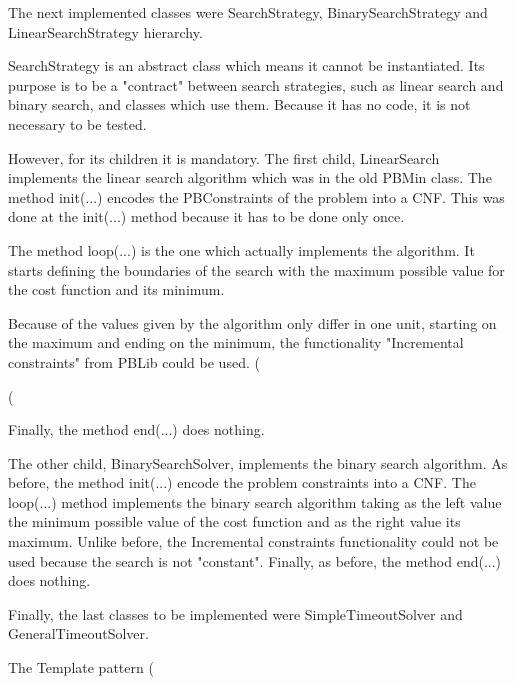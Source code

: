 The next implemented classes were SearchStrategy, BinarySearchStrategy and LinearSearchStrategy hierarchy.  

SearchStrategy is an abstract class which means it cannot be instantiated. Its purpose is to be a "contract" between search strategies, such as linear search and binary search, and classes which use them. Because it has no code, it is not necessary to be tested.  



However, for its children it is mandatory. The first child, LinearSearch implements the linear search algorithm which was in the old PBMin class. The method init(...) encodes the PBConstraints of the problem into a CNF. This was done at the init(...) method because it has to be done only once.  

The method loop(...) is the one which actually implements the algorithm. It starts defining the boundaries of the search with the maximum possible value for the cost function and its minimum.  

Because of the values given by the algorithm only differ in one unit, starting on the maximum and ending on the minimum, the functionality "Incremental constraints" from PBLib could be used. (%

(%

Finally, the method end(...) does nothing. 



The other child, BinarySearchSolver, implements the binary search algorithm. As before, the method init(...) encode the problem constraints into a CNF. The loop(...) method implements the binary search algorithm taking as the left value the minimum possible value of the cost function and as the right value its maximum. Unlike before, the Incremental constraints functionality could not be used because the search is not "constant".  Finally, as before, the method end(...) does nothing.  



Finally, the last classes to be implemented were SimpleTimeoutSolver and GeneralTimeoutSolver. 

The Template pattern (%

